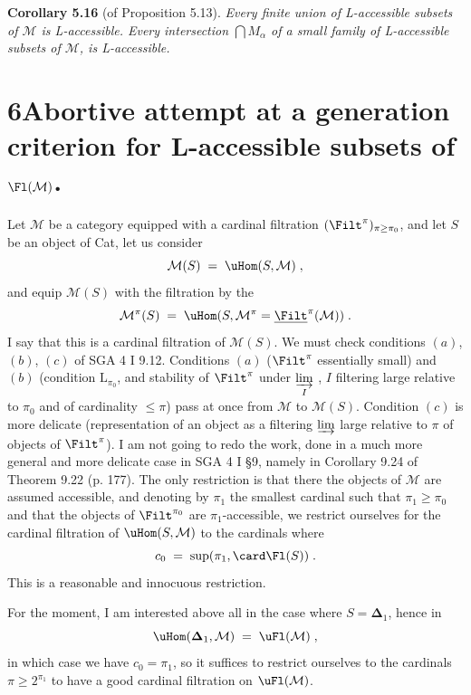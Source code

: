 \textbf{Corollary 5.16} (of Proposition 5.13). \textit{Every finite union of L-accessible subsets of $\mathcal{M}$ is L-accessible. Every intersection $\bigcap M_{\alpha}$ of a small family of L-accessible subsets of $\mathcal{M}$, is L-accessible.}


\section*{6\quad Abortive attempt at a generation criterion for L-accessible subsets of $\Fl(\mathcal{M})$.}

Let $\mathcal{M}$ be a category equipped with a cardinal filtration $(\Filt^{\pi})_{\pi\geq\pi_{0}}$, and let $S$ be an object of Cat, let us consider
\[
\mathcal{M}(S) \;=\; \uHom(S,\mathcal{M}) \; ,
\]
and equip $\mathcal{M}(S)$ with the filtration by the
\[
\mathcal{M}^{\pi}(S) \;=\; \uHom(S,\mathcal{M}^{\pi} = \underline{\Filt}^{\pi}(\mathcal{M})) \; .
\]
I say that this is a cardinal filtration of $\mathcal{M}(S)$. We must check conditions $(a)$, $(b)$, $(c)$ of SGA 4 I 9.12. Conditions $(a)$ ($\Filt^{\pi}$ essentially small) and $(b)$ (condition $\mathrm{L}_{\pi_{0}}$, and stability of $\Filt^{\pi}$ under $\varinjlim\limits_{I}$ , $I$ filtering large relative to $\pi_{0}$ and of cardinality $\leq \pi$) pass at once from $\mathcal{M}$ to $\mathcal{M}(S)$. Condition $(c)$ is more delicate (representation
of an object as a filtering $\varinjlim$ large relative to $\pi$ of objects of $\Filt^{\pi}$). I am not going to redo the work, done in a much more general and more delicate case in SGA 4 I §9, namely in Corollary 9.24 of Theorem 9.22 (p. 177). The only restriction is that there the objects of $\mathcal{M}$ are assumed accessible, and denoting by $\pi_{1}$ the smallest cardinal such that $\pi_{1} \geq \pi_{0}$ and that the objects of $\Filt^{\pi_{0}}$ are $\pi_{1}$-accessible, we restrict ourselves for the cardinal filtration of $\uHom(S,\mathcal{M})$ to the cardinals  where
\[
c_{0} \;=\; \sup(\pi_{1}, \card \Fl(S)) \; .
\]
This is a reasonable and innocuous restriction.

For the moment, I am interested above all in the case where $S = \boldsymbol{\Delta}_{1}$, hence in
\[
\uHom(\boldsymbol{\Delta}_{1},\mathcal{M}) \;=\; \uFl(\mathcal{M}) \; ,
\]
in which case we have $c_{0} = \pi_{1}$, so it suffices to restrict ourselves to the cardinals $\pi \geq 2^{\pi_{1}}$ to have a good cardinal filtration on $\uFl(\mathcal{M})$.

